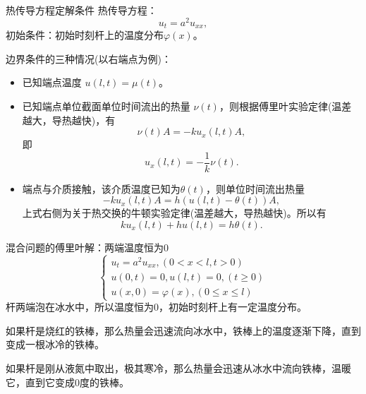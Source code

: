 \documentclass[11pt]{beamer}
\newcommand{\kong}[1][0.5]{\vspace{#1cm}}
\begin{document}
\begin{frame}{热传导方程定解条件}
热传导方程：
\begin{equation}
u_{t} = a^2 u_{xx},
\end{equation}
初始条件：初始时刻杆上的温度分布$\varphi(x)$。

边界条件的三种情况(以右端点为例)：
\begin{itemize}
\item 已知端点温度 $u(l,t) = \mu(t)$。
\item 已知端点单位截面单位时间流出的热量 $\nu(t)$，则根据傅里叶实验定律(温差越大，导热越快)，有
\begin{equation}
\nu(t) A = - k u_x (l, t) A,
\end{equation}
即
\begin{equation}
u_x (l,t) = - \frac{1}{k} \nu(t).
\end{equation}
\item 端点与介质接触，该介质温度已知为$\theta(t)$，则单位时间流出热量
\begin{equation}
- k u_x(l,t) A = h( u(l,t) - \theta(t) ) A,
\end{equation}
上式右侧为关于热交换的牛顿实验定律(温差越大，导热越快)。所以有
\begin{equation}
k u_x (l,t) + h u(l,t) = h \theta(t).
\end{equation}
\end{itemize}

\end{frame}

\begin{frame}{混合问题的傅里叶解：两端温度恒为0}
\begin{equation}
\left\{
\begin{aligned}
u_t = a^2 u_{xx}, (0<x<l, t>0) \\
u(0,t) =0, u(l,t) = 0, (t \geq 0) \\
u(x,0) = \varphi(x), (0 \leq x \leq l)
\end{aligned}
\right.
\end{equation}
杆两端泡在冰水中，所以温度恒为0，初始时刻杆上有一定温度分布。

\kong[0.5]
如果杆是烧红的铁棒，那么热量会迅速流向冰水中，铁棒上的温度逐渐下降，直到变成一根冰冷的铁棒。

\kong[0.5]
如果杆是刚从液氮中取出，极其寒冷，那么热量会迅速从冰水中流向铁棒，温暖它，直到它变成0度的铁棒。
\end{frame}
\end{document}
